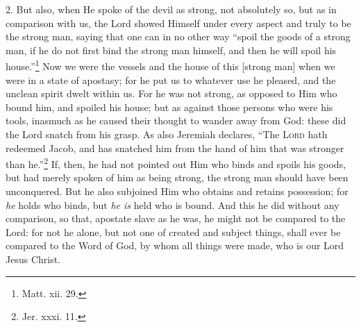 2. But also, when He spoke of the devil as strong, not absolutely so, but as in comparison with us, the Lord showed Himself under every aspect and truly to be the strong man, saying that one can in no other way “spoil the goods of a strong man, if he do not first bind the strong man himself, and then he will spoil his house.”\footnote{Matt. xii. 29.} Now we were the vessels and the house of this [strong man] when we were in a state of apostasy; for he put us to whatever use he pleased, and the unclean spirit dwelt within us. For he was not strong, as opposed to Him who bound him, and spoiled his house; but as against those persons who were his tools, inasmuch as he caused their thought to wander away from God: these did the Lord snatch from his grasp. As also Jeremiah declares, “The \textsc{Lord} hath redeemed Jacob, and has snatched him from the hand of him that was stronger than he.”\footnote{Jer. xxxi. 11.} If, then, he had not pointed out Him who binds and spoils his goods, but had merely spoken of him as being strong, the strong man should have been unconquered. But he also subjoined Him who obtains and retains possession; for \emph{he} holds who binds, but \emph{he is} held who is bound. And this he did without any comparison, so that, apostate slave as he was, he might not be compared to the Lord: for not he alone, but not one of created and subject things, shall ever be compared to the Word of God, by whom all things were made, who is our Lord Jesus Christ.

